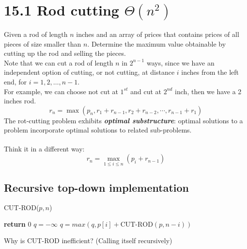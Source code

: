 \documentclass[a4paper]{article}
\begin{document}
\section*{15.1 Rod cutting $\Theta(n^2)$}
Given a rod of length $n$ inches and an array of prices that contains prices of all pieces of size smaller than $n$. Determine the maximum value obtainable by cutting up the rod and selling the pieces.\\
Note that we can cut a rod of length $n$ in $2^{n-1}$ ways, since we have an independent option of cutting, or not cutting, at distance $i$ inches from the left end, for $i=1,2,\ldots, n-1$.\\ 
For example, we can choose not cut at $1^{st}$ and cut at $2^{nd}$ inch, then we have a 2 inches rod.
\begin{equation*}
r_n=\max(p_n, r_1+r_{n-1}, r_2+r_{n-2},\cdots, r_{n-1}+r_{1})
\end{equation*}
The rot-cutting problem exhibits \textbf{\textit{optimal substructure}}: optimal solutions to a problem incorporate optimal solutions to related sub-problems.\\
\\
Think it in a different way:
    $$r_n=\max_{1\leq i\leq n}(p_i+r_{n-1})$$
    
\subsection*{Recursive top-down implementation}
    \begin{algorithm}[H]%
        \caption{CUT-ROD($p,n$)}
        \begin{algorithmic}[1] %
                \State \textbf{return }$0$
            \EndIf
            \State $q=-\infty$
            \State $q=max(q,p[i]+\text{CUT-ROD}(p,n-i))$
            \EndFor
        \end{algorithmic}
    \end{algorithm}
    Why is CUT-ROD inefficient? (Calling itself recursively)
\end{document}

